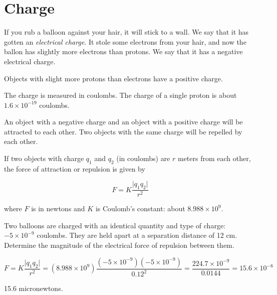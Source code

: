 \chapter{Charge}

If you rub a balloon against your hair, it will stick to a wall. We
say that it has gotten an \textit{electrical charge}. It stole some
electrons from your hair, and now the ballon has slightly more
electrons than protons.  We say that it has a negative electrical
charge.

Objects with slight more protons than electrons have a positive charge.

The charge is measured in coulombs. The charge of a single proton is
about $1.6 \times 10^{-19}$ coulombs.

An object with a negative charge and an object with a positive charge
will be attracted to each other. Two objects with the same charge will
be repelled by each other.

\begin{mdframed}[style=important, frametitle={Coulomb's Law}]

  If two objects with charge $q_1$ and $q_2$ (in coulombs) are $r$ meters from each other, the force of attraction or repulsion is given by

  $$F = K\frac{\lvert q_1 q_2 \rvert}{r^2}$$

    where $F$ is in newtons and $K$ is Coulomb's constant: about $8.988 \times 10^9$.
  
\end{mdframed}


\begin{Exercise}[title={Coulomb's Law}, label=charged_balloons]

Two balloons are charged with an identical quantity and type of
charge: $-5 \times 10^{-9}$ coulombs. They are held apart at a
separation distance of 12 cm. Determine the magnitude of the
electrical force of repulsion between them. 
  
\end{Exercise}
\begin{Answer}[ref=charged_balloons]

  $$F = K\frac{\lvert q_1 q_2 \rvert}{r^2} = (8.988 \times 10^9) \frac{(-5 \times 10^{-9})(-5 \times 10^{-9})}{0.12^2} = \frac{224.7 \times 10^{-9}}{0.0144} = 15.6 \times 10^{-6}$$

  15.6 micronewtons.
  
\end{Answer}

